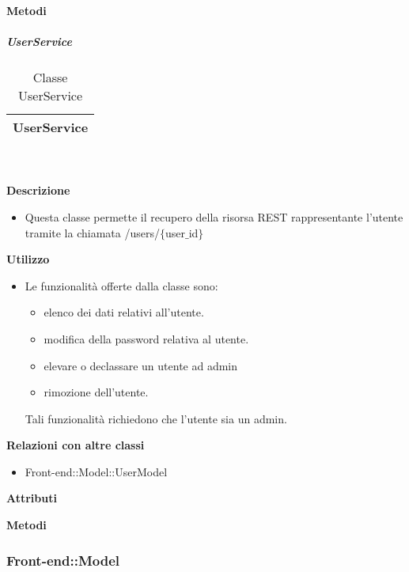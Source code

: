 		\textbf{Metodi} 
	\begin{itemize}
		\end{itemize}
			\subparagraph{UserService} 
\begin{table}[ht]
\begin{center}
\bgroup
	\setlength{\arrayrulewidth}{0.6mm}
	\def\arraystretch{1}
		\begin{tabular}{ | p{12cm} | }
				\hline  
					\centerline{\textbf{UserService}}
		\\ \hline 
				\hline
				\hline
		
		\end{tabular}
\egroup
\caption{Classe UserService}
\end{center}
\end{table}  \textbf{\\ \\ Descrizione} 
					\begin{itemize}
						\item[] Questa classe permette il recupero della risorsa REST rappresentante l'utente tramite la chiamata /users/$\{$user$\_$id$\}$
					\end{itemize}      
				\textbf{Utilizzo}  
					\begin{itemize}
						\item[] Le funzionalità offerte dalla classe sono: 
\begin{itemize} 
\item elenco dei dati relativi all'utente. 
\item modifica della password relativa al utente.
\item elevare o declassare un utente ad admin 
\item rimozione dell'utente.
\end{itemize}
Tali funzionalità richiedono che l'utente sia un admin.
					\end{itemize}
					\textbf{Relazioni con altre classi}
					\begin{itemize}
							\item{Front-end::Model::UserModel}
					\end{itemize}
			 \textbf{Attributi} 
	\begin{itemize}
		\end{itemize}
		
		\textbf{Metodi} 
	\begin{itemize}
		\end{itemize}
	\subsubsection{Front-end::Model} 
